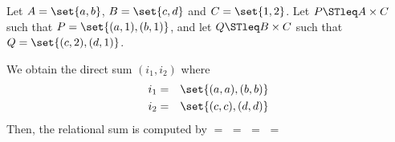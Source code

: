 \begin{example}
\label{ex:relational_sum}
	Let $A = \set{a,b}$, $B = \set{c, d}$ and $C = \set{1,2}$. Let $P \STleq A \times C$ such that $P = \set{(a,1),(b,1)}$, and let $Q \STleq B \times C$ such that $Q = \set{(c,2),(d,1)}$. 
	
	We obtain the direct sum $(i_1, i_2)$ where
	\begin{eqnarray*}
		i_1 &=& \set{(a,a),(b,b)} \\
		i_2 &=& \set{(c,c),(d,d)}
	\end{eqnarray*}
	Then, the relational sum is computed by 
	\Beginproof
		$=$ 
		$=$ 
		$=$ 
		$=$ 
	\Endproof
\end{example}